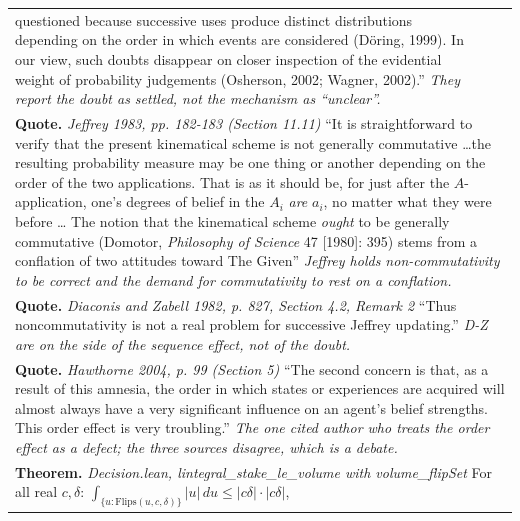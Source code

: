 \documentclass[10pt]{article}
\theoremstyle{definition}
\newlength{\fullw}\setlength{\fullw}{25.9cm}
\begin{document}
{\begin{longtable}{|p{0.9cm}|p{12.2cm}|p{12.2cm}|}
{questioned because successive uses produce distinct distributions depending on
the order in which events are considered (D\"{o}ring, 1999). In our view, such
doubts disappear on closer inspection of the evidential weight of probability
judgements (Osherson, 2002; Wagner, 2002).'' \newline \textit{They report the doubt as settled, not the mechanism as ``unclear''.}} \\
\multicolumn{3}{|p{\fullw}|}{\textbf{Quote.} \textit{Jeffrey 1983, pp. 182-183 (Section 11.11)} \newline ``It is straightforward to verify that the present kinematical
scheme is not generally commutative \ldots the resulting probability measure
may be one thing or another depending on the order of the two applications.
That is as it should be, for just after the $A$-application, one's degrees of
belief in the $A_i$ \emph{are} $a_i$, no matter what they were before \ldots
The notion that the kinematical scheme \emph{ought} to be generally commutative
(Domotor, \emph{Philosophy of Science} 47 [1980]: 395) stems from a conflation
of two attitudes toward The Given'' \newline \textit{Jeffrey holds non-commutativity to be correct and the demand for
commutativity to rest on a conflation.}} \\
\multicolumn{3}{|p{\fullw}|}{\textbf{Quote.} \textit{Diaconis and Zabell 1982, p. 827, Section 4.2, Remark 2} \newline ``Thus noncommutativity is not a real problem for successive
Jeffrey updating.'' \newline \textit{D-Z are on the side of the sequence effect, not of the doubt.}} \\
\multicolumn{3}{|p{\fullw}|}{\textbf{Quote.} \textit{Hawthorne 2004, p. 99 (Section 5)} \newline ``The second concern is that, as a result of this amnesia, the
order in which states or experiences are acquired will almost always have a
very significant influence on an agent's belief strengths. This order effect
is very troubling.'' \newline \textit{The one cited author who treats the order effect as a defect; the
three sources disagree, which is a debate.}} \\
\multicolumn{3}{|p{\fullw}|}{\textbf{Theorem.} \textit{Decision.lean, lintegral\_stake\_le\_volume with volume\_flipSet} \newline For all real $c,\delta$:
$\int_{\{u:\mathrm{Flips}(u,c,\delta)\}} |u|\,du \le |c\delta|\cdot|c\delta|$,
}
\end{longtable}}
\end{document}

